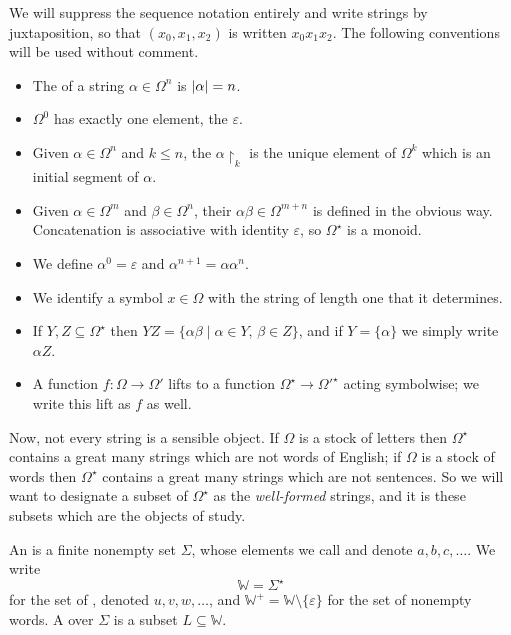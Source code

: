 \documentclass[a4paper]{scrartcl}
\newcommand{\WW}{\mathbb{W}}
\newcommand{\eps}{\varepsilon}
\begin{document}
We will suppress the sequence notation entirely and write strings by juxtaposition, so that $(x_0, x_1, x_2)$ is written $x_0x_1x_2$. The following conventions will be used without comment.
\begin{itemize}
	\item The  of a string $\alpha \in \Omega^n$ is $\lvert\alpha\rvert = n$.
	\item $\Omega^0$ has exactly one element, the  $\eps$.
	\item Given $\alpha \in \Omega^n$ and $k \leq n$, the  $\alpha\restriction_k$ is the unique element of $\Omega^k$ which is an initial segment of $\alpha$.
	\item Given $\alpha \in \Omega^m$ and $\beta \in \Omega^n$, their  $\alpha\beta \in \Omega^{m+n}$ is defined in the obvious way. Concatenation is associative with identity $\eps$, so $\Omega^\star$ is a monoid.
	\item We define $\alpha^0 = \eps$ and $\alpha^{n+1} = \alpha\alpha^n$.
	\item We identify a symbol $x \in \Omega$ with the string of length one that it determines.
	\item If $Y, Z \subseteq \Omega^\star$ then $YZ = \{\alpha\beta \mid \alpha \in Y,\, \beta \in Z\}$, and if $Y = \{\alpha\}$ we simply write $\alpha Z$.
	\item A function $f \colon \Omega \to \Omega'$ lifts to a function $\Omega^\star \to \Omega'^\star$ acting symbolwise; we write this lift as $f$ as well.
\end{itemize}

Now, not every string is a sensible object. If $\Omega$ is a stock of letters then $\Omega^\star$ contains a great many strings which are not words of English; if $\Omega$ is a stock of words then $\Omega^\star$ contains a great many strings which are not sentences. So we will want to designate a subset of $\Omega^\star$ as the \emph{well-formed} strings, and it is these subsets which are the objects of study.

\begin{definition}
	An  is a finite nonempty set $\Sigma$, whose elements we call  and denote $a, b, c, \dots$. We write
	$$\WW = \Sigma^\star$$
	for the set of , denoted $u, v, w, \dots$, and $\WW^+ = \WW \setminus \{\eps\}$ for the set of nonempty words. A  over $\Sigma$ is a subset $L \subseteq \WW$.
\end{definition}
\end{document}

